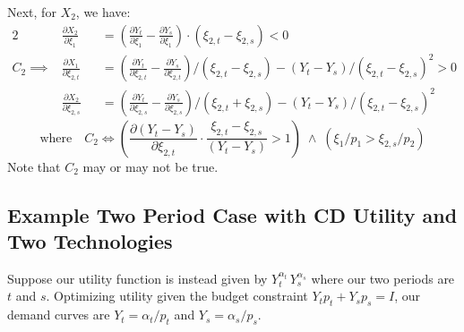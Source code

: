 \documentclass[12pt,a4paper]{extarticle}
\begin{document}
Next, for $X_2$, we have:
\begin{alignat*}{2}
&\frac{\partial X_2}{\partial \xi_1} &&= 
\left( \frac{\partial Y_t}{\partial \xi_{1}} -  \frac{\partial Y_s}{\partial \xi_{1}} \right) \cdot (\xi_{2,t} - \xi_{2,s}) < 0 \\
C_2 \implies &\frac{\partial X_1}{\partial \xi_{2,t}} &&= \left(\frac{\partial Y_t}{\partial \xi_{2,t}} - \frac{\partial Y_s}{\partial \xi_{2,t}}\right)/(\xi_{2,t} - \xi_{2,s}) - (Y_t - Y_s)/(\xi_{2,t} - \xi_{2,s})^2 > 0 \\
&\frac{\partial X_2}{\partial \xi_{2,s}} &&= \left(\frac{\partial Y_t}{\partial \xi_{2,s}} - \frac{\partial Y_s}{\partial \xi_{2,s}}\right)/(\xi_{2,t} + \xi_{2,s}) - (Y_t - Y_s)/(\xi_{2,t} - \xi_{2,s})^2 
\end{alignat*}
$$\text{where} \quad C_2 \iff \left(\frac{\partial (Y_t - Y_s)}{\partial \xi_{2,t}} \cdot \frac{\xi_{2,t} - \xi_{2,s}}{(Y_t - Y_s)} > 1\right) \; \wedge \; \left(\xi_1 / p_1 > \xi_{2,s} / p_2 \right)$$
Note that $C_2$ may or may not be true. 

\subsection{Example Two Period Case with CD Utility and Two Technologies}

Suppose our utility function is instead given by $Y_t^{\alpha_t} \, Y_s^{\alpha_s}$ where our two periods are $t$ and $s$. Optimizing utility given the budget constraint $Y_t p_t + Y_s p_s = I$, our demand curves are $Y_t = \alpha_t / p_t$ and $Y_s = \alpha_s / p_s$. 
\end{document}
